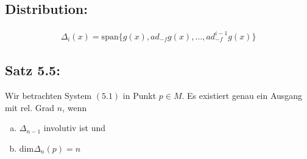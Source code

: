 \documentclass[ngerman]{tudscrreprt}
\begin{document}
\subsection*{Distribution:}
\begin{align*}
\Delta_i(x) = \text{span}\{ g(x) ,ad_{-f}g(x) ,\dots, ad_{-f}^{i-1}g(x)\}
\end{align*}
\subsection*{Satz 5.5:} Wir betrachten System $(5.1)$ in Punkt $p \in M.$ Es existiert genau ein Ausgang mit rel. Grad $n$, wenn 
\begin{enumerate}[a)]
\item $\Delta_{n-1} $ involutiv ist und 
\item dim$\Delta_n(p) = n$
\end{enumerate}
\end{document}
